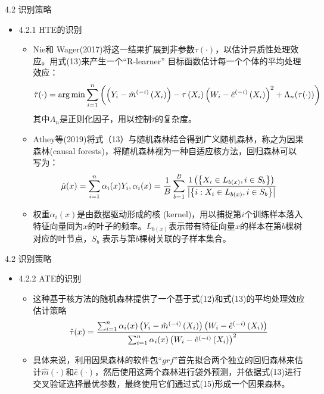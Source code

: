 \documentclass{beamer}%
\begin{document}
\begin{frame}[t]{\large 4.2 识别策略}
\begin{itemize}
  \item 4.2.1 HTE的识别
  \begin{itemize}
  \item Nie和 Wager(2017)将这一结果扩展到非参数$\tau(\cdot)$，以估计异质性处理效应。用式(13)来产生一个“R-learner” 目标函数估计每一个个体的平均处理效应：
  \begin{equation}
  \setlength{\abovedisplayskip}{3.5pt}
  \setlength{\belowdisplayskip}{3.5pt}
    \hat{\tau}(\cdot)=\arg \min \sum_{i=1}^n\left(\left(Y_i-\hat{m}^{(-i)}\left(X_i\right)\right)-\tau\left(X_i\right)\left(W_i-\hat{e}^{(-i)}\left(X_i\right)\right)^2+\Lambda_n(\tau(\cdot))\right)
  \end{equation}
  其中$\Lambda_n$是正则化因子，用以控制$\hat{\tau}$的复杂度。
  \item Athey等(2019)将式（13）与随机森林结合得到广义随机森林，称之为因果森林(causal forests)，将随机森林视为一种自适应核方法，回归森林可以写为：
  \begin{equation}
    \setlength{\abovedisplayskip}{2pt}
    \setlength{\belowdisplayskip}{2pt}
    \hat{\mu}(x)=\sum_{i=1}^n \alpha_i(x) Y_i, \alpha_i(x)=\frac{1}{B} \sum_{b=1}^B \frac{1\left(\left\{X_i \in L_{b(x)}, i \in S_b\right\}\right)}{\left|\left\{i: X_i \in L_{b(x)}, i \in S_b\right\}\right|}
  \end{equation}
  \item 权重$\alpha_i(x)$是由数据驱动形成的核 (kernel)，用以捕捉第$i$个训练样本落入特征向量同为$x$的叶子的频率。$L_{b(x)}$表示带有特征向量$x$的样本在第$b$棵树对应的叶节点，$S_b$ 表示与第$b$棵树关联的子样本集合。
 \end{itemize}
\end{itemize}
\end{frame}



\begin{frame}[t]{\large 4.2 识别策略}
\begin{itemize}
  \item 4.2.2 ATE的识别
  \begin{itemize}
  \item 这种基于核方法的随机森林提供了一个基于式(12)和式(13)的平均处理效应估计策略
    \begin{equation}
    \setlength{\abovedisplayskip}{4pt}
    \setlength{\belowdisplayskip}{4pt}
    \hat{\tau}(x)=\frac{\sum_{i=1}^n \alpha_i(x)\left(Y_i-\hat{m}^{(-i)}\left(X_i\right)\right)\left(W_i-\hat{e}^{(-i)}\left(X_i\right)\right)}{\sum_{i=1}^n \alpha_i(x)\left(W_i-\hat{e}^{(-i)}\left(X_i\right)\right)^2}
    \end{equation}
  \item 具体来说，利用因果森林的软件包“$grf$”首先拟合两个独立的回归森林来估计$\hat{m}(\cdot)$和$\hat{e}(\cdot)$，然后使用这两个森林进行袋外预测，并依据式(13)进行交叉验证选择最优参数，最终使用它们通过式(15)形成一个因果森林。
  \end{itemize}
\end{itemize}
\end{frame}
\end{document}
